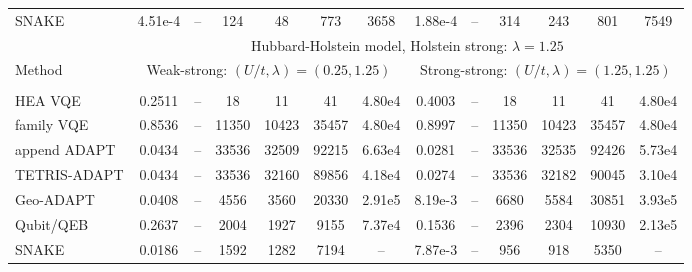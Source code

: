 \documentclass[
  reprint,
  amsmath,
  amssymb,
  aps,
  pra,
  nofootinbib,
  superscriptaddress,
  floatfix
]{revtex4-2}
\newcommand{\metrichead}[1]{\makebox[0.061\textwidth][c]{#1}}
\begin{document}
\begin{widetext}
\begin{minipage}{\textwidth}
\begin{center}
\begin{ruledtabular}
\begin{tabular}{p{}cccccc|cccccc}
SNAKE & 4.51e-4 & -- & 124 & 48 & 773 & 3658 & 1.88e-4 & -- & 314 & 243 & 801 & 7549\\
\colrule
& \multicolumn{12}{c}{Hubbard-Holstein model, Holstein strong: $\lambda=1.25$}\\
\cline{2-13}
Method & \multicolumn{6}{c|}{Weak-strong: $(U/t,\lambda)=(0.25,1.25)$} & \multicolumn{6}{c}{Strong-strong: $(U/t,\lambda)=(1.25,1.25)$}\\
\cline{2-7}\cline{8-13}
 & \metrichead{$\Delta E$} & \metrichead{$1-F$} & \metrichead{$N_{2q}$} & \metrichead{$D_{2q}$} & \metrichead{$D_c$} & \metrichead{$S$} & \metrichead{$\Delta E$} & \metrichead{$1-F$} & \metrichead{$N_{2q}$} & \metrichead{$D_{2q}$} & \metrichead{$D_c$} & \metrichead{$S$}\\
\colrule
HEA VQE & 0.2511 & -- & 18 & 11 & 41 & 4.80e4 & 0.4003 & -- & 18 & 11 & 41 & 4.80e4\\
family VQE & 0.8536 & -- & 11350 & 10423 & 35457 & 4.80e4 & 0.8997 & -- & 11350 & 10423 & 35457 & 4.80e4\\
append ADAPT & 0.0434 & -- & 33536 & 32509 & 92215 & 6.63e4 & 0.0281 & -- & 33536 & 32535 & 92426 & 5.73e4\\
TETRIS-ADAPT & 0.0434 & -- & 33536 & 32160 & 89856 & 4.18e4 & 0.0274 & -- & 33536 & 32182 & 90045 & 3.10e4\\
Geo-ADAPT & 0.0408 & -- & 4556 & 3560 & 20330 & 2.91e5 & 8.19e-3 & -- & 6680 & 5584 & 30851 & 3.93e5\\
Qubit/QEB & 0.2637 & -- & 2004 & 1927 & 9155 & 7.37e4 & 0.1536 & -- & 2396 & 2304 & 10930 & 2.13e5\\
SNAKE & 0.0186 & -- & 1592 & 1282 & 7194 & -- & 7.87e-3 & -- & 956 & 918 & 5350 & --\\
\end{tabular}
\end{ruledtabular}
\end{center}
\end{minipage}
\par\addvspace{1.0ex}

\end{widetext}
\end{document}
